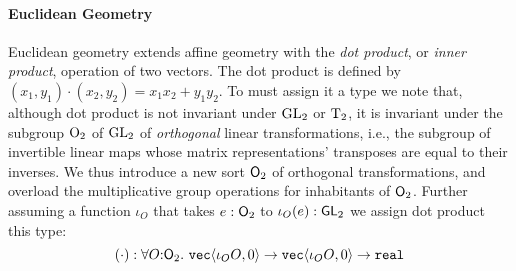 \paragraph{Euclidean Geometry} Euclidean geometry extends affine
geometry with the \emph{dot product}, or \emph{inner product},
operation of two vectors. The dot product is defined 
by
$  (x_1,y_1) \cdot (x_2,y_2) = x_1x_2 + y_1y_2$.
To %
must assign it a type we note that, although dot product is not
invariant under $\mathrm{GL}_2$ or $\mathrm{T}_2$, it
is invariant under the subgroup $\mathrm{O}_2$ of $\mathrm{GL}_2$ of
\emph{orthogonal} linear transformations, i.e., the subgroup of
invertible linear maps whose matrix representations' transposes are
equal to their inverses. We thus introduce a new sort $\mathsf{O}_2$ of
orthogonal transformations, and overload the multiplicative group
operations for inhabitants of $\mathsf{O}_2$. Further assuming a
function $\iota_O$ that takes $e : \mathsf{O}_2$ to $\iota_O(e) :
\mathsf{GL}_2$ we assign dot product this type:
\begin{displaymath}
  (\cdot) : \forall O \mathord: \SynOrth{2}.\ \tyPrim{vec}{\iota_OO, 0} \to \tyPrim{vec}{\iota_OO, 0} \to \tyPrimNm{real}
\end{displaymath}

